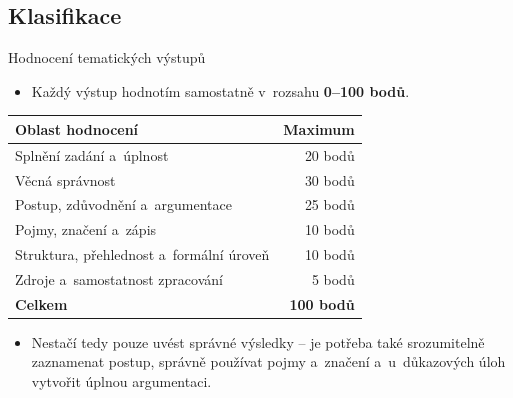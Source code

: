 \documentclass[11pt,professionalfont,aspectratio=43]{beamer}
\begin{document}
    \subsection{Klasifikace}

    \begin{frame}{Hodnocení tematických výstupů}
        \begin{itemize}
            \item Každý výstup hodnotím samostatně v~rozsahu \textbf{0--100 bodů}.
        \end{itemize}

        \begin{center}
            \begin{tabular}{l|r}
                \textbf{Oblast hodnocení} & \textbf{Maximum} \\ \hline
                Splnění zadání a~úplnost & 20 bodů \\
                Věcná správnost & 30 bodů \\
                Postup, zdůvodnění a~argumentace & 25 bodů \\
                Pojmy, značení a~zápis & 10 bodů \\
                Struktura, přehlednost a~formální úroveň & 10 bodů \\
                Zdroje a~samostatnost zpracování & 5 bodů \\ \hline
                \textbf{Celkem} & \textbf{100 bodů} \\
            \end{tabular}
        \end{center}

        \begin{itemize}
            \item Nestačí tedy pouze uvést správné výsledky -- je potřeba také srozumitelně zaznamenat postup, správně používat pojmy a~značení a~u~důkazových úloh vytvořit úplnou argumentaci.
        \end{itemize}
    \end{frame}
\end{document}
